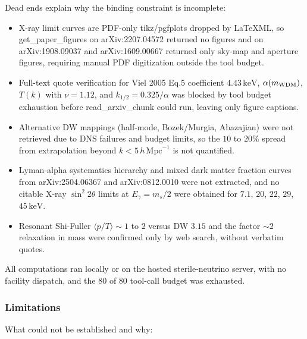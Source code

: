 \documentclass[11pt,a4paper]{article}
\begin{document}
Dead ends explain why the binding constraint is incomplete:

\begin{itemize}
  \item X-ray limit curves are PDF-only tikz/pgfplots dropped by LaTeXML, so get\_paper\_figures on arXiv:2207.04572 returned no figures and on arXiv:1908.09037 and arXiv:1609.00667 returned only sky-map and aperture figures, requiring manual PDF digitization outside the tool budget.
  \item Full-text quote verification for Viel 2005 Eq.5 coefficient $4.43\,\mathrm{keV}$, $\alpha(m_{\rm WDM})$, $T(k)$ with $\nu = 1.12$, and $k_{1/2} = 0.325/\alpha$ was blocked by tool budget exhaustion before read\_arxiv\_chunk could run, leaving only figure captions.
  \item Alternative DW mappings (half-mode, Bozek/Murgia, Abazajian) were not retrieved due to DNS failures and budget limits, so the $10$ to $20\%$ spread from extrapolation beyond $k < 5\,h\,\mathrm{Mpc}^{-1}$ is not quantified.
  \item Lyman-alpha systematics hierarchy and mixed dark matter fraction curves from arXiv:2504.06367 and arXiv:0812.0010 were not extracted, and no citable X-ray $\sin^2 2\theta$ limits at $E_\gamma = m_s/2$ were obtained for $7.1$, $20$, $22$, $29$, $45\,\mathrm{keV}$.
  \item Resonant Shi-Fuller $\langle p/T \rangle \sim 1$ to $2$ versus DW $3.15$ and the factor $\sim 2$ relaxation in mass were confirmed only by web search, without verbatim quotes.
\end{itemize}
All computations ran locally or on the hosted sterile-neutrino server, with no facility dispatch, and the $80$ of $80$ tool-call budget was exhausted.

\subsubsection*{Limitations}
What could not be established and why:
\end{document}
